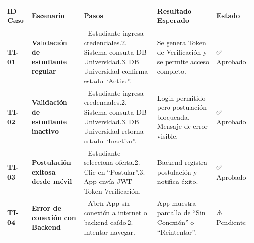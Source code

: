 \documentclass[
  letterpaper,
  DIV=11,
  numbers=noendperiod]{scrartcl}
\begin{document}
\begin{longtable}[]{@{}
  >{\centering\arraybackslash}p{}
  >{\raggedright\arraybackslash}p{}
  >{\raggedright\arraybackslash}p{}
  >{\raggedright\arraybackslash}p{}
  >{\raggedright\arraybackslash}p{}@{}}
\toprule\noalign{}
\begin{minipage}[b]{\linewidth}\centering
ID Caso
\end{minipage} & \begin{minipage}[b]{\linewidth}\raggedright
Escenario
\end{minipage} & \begin{minipage}[b]{\linewidth}\raggedright
Pasos
\end{minipage} & \begin{minipage}[b]{\linewidth}\raggedright
Resultado Esperado
\end{minipage} & \begin{minipage}[b]{\linewidth}\raggedright
Estado
\end{minipage} \\
\midrule\noalign{}
\endhead
\bottomrule\noalign{}
\endlastfoot
\textbf{TI-01} & \textbf{Validación de estudiante regular} & 1.
Estudiante ingresa credenciales.2. Sistema consulta DB Universidad.3. DB
Universidad confirma estado ``Activo''. & Se genera Token de
Verificación y se permite acceso completo. & ✅ Aprobado \\
\textbf{TI-02} & \textbf{Validación de estudiante inactivo} & 1.
Estudiante ingresa credenciales.2. Sistema consulta DB Universidad.3. DB
Universidad retorna estado ``Inactivo''. & Login permitido pero
postulación bloqueada. Mensaje de error visible. & ✅ Aprobado \\
\textbf{TI-03} & \textbf{Postulación exitosa desde móvil} & 1.
Estudiante selecciona oferta.2. Clic en ``Postular''.3. App envía JWT +
Token Verificación. & Backend registra postulación y notifica éxito. &
✅ Aprobado \\
\textbf{TI-04} & \textbf{Error de conexión con Backend} & 1. Abrir App
sin conexión a internet o backend caído.2. Intentar navegar. & App
muestra pantalla de ``Sin Conexión'' o ``Reintentar''. & ⚠️ Pendiente \\
\end{longtable}
\end{document}
